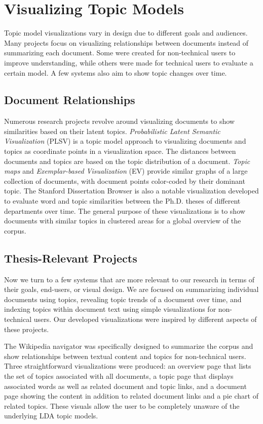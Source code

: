 \section{Visualizing Topic Models}

Topic model visualizations vary in design due to different goals and audiences. Many
projects focus on visualizing relationships between documents instead of summarizing
each document. Some were created for non-technical users to improve understanding,
while others were made for technical users to evaluate a certain model. A few systems
also aim to show topic changes over time.

\subsection{Document Relationships}

Numerous research projects revolve around visualizing documents to show similarities
based on their latent topics. \textit{Probabilistic Latent Semantic Visualization} (PLSV) \cite{plsv}
is a topic model approach to visualizing documents and topics as coordinate points in
a visualization space. The distances between documents and topics are based on the
topic distribution of a document. \textit{Topic maps} \cite{topic-maps} and \textit{Exemplar-based Visualization}
(EV) \cite{ev} provide similar graphs of a large collection of documents, with document
points color-coded by their dominant topic. The Stanford Dissertation Browser \cite{interpretation-trust} is
also a notable visualization developed to evaluate word and topic similarities between
the Ph.D. theses of different departments over time. The general purpose of these
visualizations is to show documents with similar topics in clustered areas for a global
overview of the corpus.

\subsection{Thesis-Relevant Projects}

Now we turn to a few systems that are more relevant to our research in terms of
their goals, end-users, or visual design. We are focused on summarizing individual
documents using topics, revealing topic trends of a document over time, and indexing
topics within document text using simple visualizations for non-technical users. Our
developed visualizations were inspired by different aspects of these projects.

The Wikipedia navigator \cite{wikipedia} was specifically designed to summarize the corpus
and show relationships between textual content and topics for non-technical users.
Three straightforward visualizations were produced: an overview page that lists the
set of topics associated with all documents, a topic page that displays associated
words as well as related document and topic links, and a document page showing the
content in addition to related document links and a pie chart of related topics. These
visuals allow the user to be completely unaware of the underlying LDA topic models.

